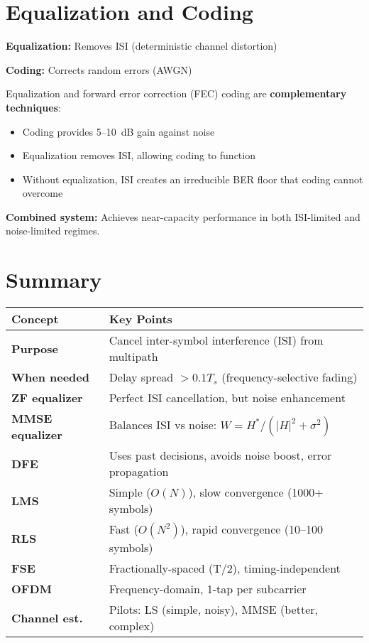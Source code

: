\section{Equalization and Coding}
\label{sec:equalization-coding}

\textbf{Equalization:} Removes ISI (deterministic channel distortion)

\textbf{Coding:} Corrects random errors (AWGN)

\begin{keyconcept}
Equalization and forward error correction (FEC) coding are \textbf{complementary techniques}:
\begin{itemize}
\item Coding provides 5--10~dB gain against noise
\item Equalization removes ISI, allowing coding to function
\item Without equalization, ISI creates an irreducible BER floor that coding cannot overcome
\end{itemize}
\end{keyconcept}

\textbf{Combined system:} Achieves near-capacity performance in both ISI-limited and noise-limited regimes.

\section{Summary}

\begin{center}
\begin{tabular}{@{}ll@{}}
\toprule
\textbf{Concept} & \textbf{Key Points} \\
\midrule
\textbf{Purpose} & Cancel inter-symbol interference (ISI) from multipath \\
\textbf{When needed} & Delay spread $> 0.1T_s$ (frequency-selective fading) \\
\textbf{ZF equalizer} & Perfect ISI cancellation, but noise enhancement \\
\textbf{MMSE equalizer} & Balances ISI vs noise: $W = H^*/(|H|^2 + \sigma^2)$ \\
\textbf{DFE} & Uses past decisions, avoids noise boost, error propagation \\
\textbf{LMS} & Simple ($O(N)$), slow convergence (1000+ symbols) \\
\textbf{RLS} & Fast ($O(N^2)$), rapid convergence (10--100 symbols) \\
\textbf{FSE} & Fractionally-spaced (T/2), timing-independent \\
\textbf{OFDM} & Frequency-domain, 1-tap per subcarrier \\
\textbf{Channel est.} & Pilots: LS (simple, noisy), MMSE (better, complex) \\
\bottomrule
\end{tabular}
\end{center}

